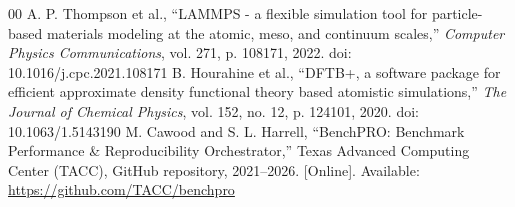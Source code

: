 \documentclass[conference]{IEEEtran}
\begin{document}
\begin{thebibliography}{00}
 A. P. Thompson et al., ``LAMMPS - a flexible simulation tool for particle-based materials modeling at the atomic, meso, and continuum scales,'' \textit{Computer Physics Communications}, vol. 271, p. 108171, 2022. doi: 10.1016/j.cpc.2021.108171
 B. Hourahine et al., ``DFTB+, a software package for efficient approximate density functional theory based atomistic simulations,'' \textit{The Journal of Chemical Physics}, vol. 152, no. 12, p. 124101, 2020. doi: 10.1063/1.5143190
 M. Cawood and S. L. Harrell, ``BenchPRO: Benchmark Performance \& Reproducibility Orchestrator,'' Texas Advanced Computing Center (TACC), GitHub repository, 2021--2026. [Online]. Available: \url{https://github.com/TACC/benchpro}
\end{thebibliography}
\end{document}
